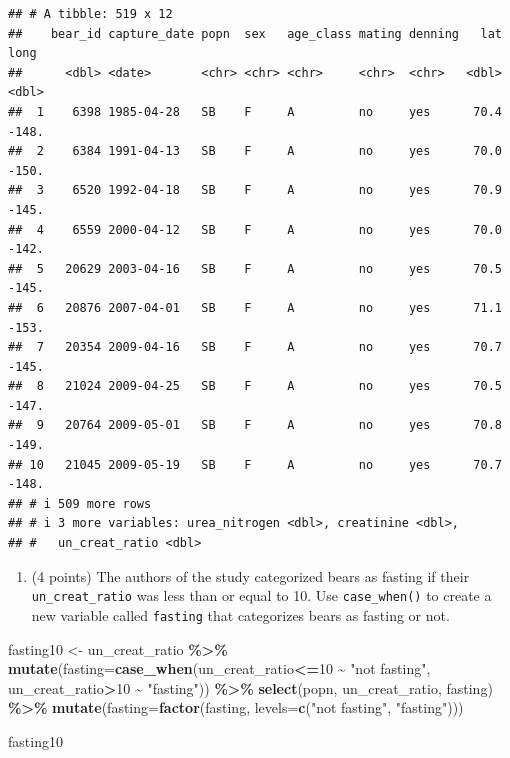 \documentclass[
]{article}
\newenvironment{Shaded}{\begin{snugshade}}{\end{snugshade}}
\newcommand{\AttributeTok}[1]{\textcolor[rgb]{0.13,0.29,0.53}{#1}}
\newcommand{\DecValTok}[1]{\textcolor[rgb]{0.00,0.00,0.81}{#1}}
\newcommand{\FunctionTok}[1]{\textcolor[rgb]{0.13,0.29,0.53}{\textbf{#1}}}
\newcommand{\NormalTok}[1]{#1}
\newcommand{\OtherTok}[1]{\textcolor[rgb]{0.56,0.35,0.01}{#1}}
\newcommand{\SpecialCharTok}[1]{\textcolor[rgb]{0.81,0.36,0.00}{\textbf{#1}}}
\newcommand{\StringTok}[1]{\textcolor[rgb]{0.31,0.60,0.02}{#1}}
\providecommand{\tightlist}{%
  \setlength{\itemsep}{0pt}\setlength{\parskip}{0pt}}
\begin{document}
\begin{verbatim}
## # A tibble: 519 x 12
##    bear_id capture_date popn  sex   age_class mating denning   lat  long
##      <dbl> <date>       <chr> <chr> <chr>     <chr>  <chr>   <dbl> <dbl>
##  1    6398 1985-04-28   SB    F     A         no     yes      70.4 -148.
##  2    6384 1991-04-13   SB    F     A         no     yes      70.0 -150.
##  3    6520 1992-04-18   SB    F     A         no     yes      70.9 -145.
##  4    6559 2000-04-12   SB    F     A         no     yes      70.0 -142.
##  5   20629 2003-04-16   SB    F     A         no     yes      70.5 -145.
##  6   20876 2007-04-01   SB    F     A         no     yes      71.1 -153.
##  7   20354 2009-04-16   SB    F     A         no     yes      70.7 -145.
##  8   21024 2009-04-25   SB    F     A         no     yes      70.5 -147.
##  9   20764 2009-05-01   SB    F     A         no     yes      70.8 -149.
## 10   21045 2009-05-19   SB    F     A         no     yes      70.7 -148.
## # i 509 more rows
## # i 3 more variables: urea_nitrogen <dbl>, creatinine <dbl>,
## #   un_creat_ratio <dbl>
\end{verbatim}

\begin{enumerate}
\def\labelenumi{\arabic{enumi}.}
\setcounter{enumi}{6}
\tightlist
\item
  (4 points) The authors of the study categorized bears as fasting if
  their \texttt{un\_creat\_ratio} was less than or equal to 10. Use
  \texttt{case\_when()} to create a new variable called \texttt{fasting}
  that categorizes bears as fasting or not.
\end{enumerate}

\begin{Shaded}
\begin{Highlighting}[]
\NormalTok{fasting10 }\OtherTok{\textless{}{-}}\NormalTok{ un\_creat\_ratio }\SpecialCharTok{\%\textgreater{}\%} 
  \FunctionTok{mutate}\NormalTok{(}\AttributeTok{fasting=}\FunctionTok{case\_when}\NormalTok{(un\_creat\_ratio}\SpecialCharTok{\textless{}=}\DecValTok{10} \SpecialCharTok{\textasciitilde{}} \StringTok{"not fasting"}\NormalTok{,}
\NormalTok{                                   un\_creat\_ratio}\SpecialCharTok{\textgreater{}}\DecValTok{10} \SpecialCharTok{\textasciitilde{}} \StringTok{"fasting"}\NormalTok{)) }\SpecialCharTok{\%\textgreater{}\%} 
  \FunctionTok{select}\NormalTok{(popn, un\_creat\_ratio, fasting) }\SpecialCharTok{\%\textgreater{}\%} 
  \FunctionTok{mutate}\NormalTok{(}\AttributeTok{fasting=}\FunctionTok{factor}\NormalTok{(fasting,}
                                \AttributeTok{levels=}\FunctionTok{c}\NormalTok{(}\StringTok{"not fasting"}\NormalTok{,}
                                         \StringTok{"fasting"}\NormalTok{)))}

\NormalTok{fasting10}
\end{Highlighting}
\end{Shaded}
\end{document}
